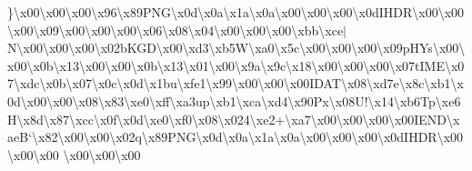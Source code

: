 \begin{DoxyCompactItemize}
\}\textbackslash{}x00\textbackslash{}x00\textbackslash{}x00\textbackslash{}x96\textbackslash{}x89\+P\+N\+G\textbackslash{}x0d\textbackslash{}x0a\textbackslash{}x1a\textbackslash{}x0a\textbackslash{}x00\textbackslash{}x00\textbackslash{}x00\textbackslash{}x0d\+I\+H\+D\+R\textbackslash{}x00\textbackslash{}x00\textbackslash{}x00\textbackslash{}x09\textbackslash{}x00\textbackslash{}x00\textbackslash{}x00\textbackslash{}x06\textbackslash{}x08\textbackslash{}x04\textbackslash{}x00\textbackslash{}x00\textbackslash{}x00\textbackslash{}xbb\textbackslash{}xce$\vert$\+N\textbackslash{}x00\textbackslash{}x00\textbackslash{}x00\textbackslash{}x02b\+K\+G\+D\textbackslash{}x00\textbackslash{}xd3\textbackslash{}xb5\+W\textbackslash{}xa0\textbackslash{}x5c\textbackslash{}x00\textbackslash{}x00\textbackslash{}x00\textbackslash{}x09p\+H\+Ys\textbackslash{}x00\textbackslash{}x00\textbackslash{}x0b\textbackslash{}x13\textbackslash{}x00\textbackslash{}x00\textbackslash{}x0b\textbackslash{}x13\textbackslash{}x01\textbackslash{}x00\textbackslash{}x9a\textbackslash{}x9c\textbackslash{}x18\textbackslash{}x00\textbackslash{}x00\textbackslash{}x00\textbackslash{}x07t\+I\+M\+E\textbackslash{}x07\textbackslash{}xdc\textbackslash{}x0b\textbackslash{}x07\textbackslash{}x0c\textbackslash{}x0d\textbackslash{}x1bu\textbackslash{}xfe1\textbackslash{}x99\textbackslash{}x00\textbackslash{}x00\textbackslash{}x00\textquotesingle{}\+I\+D\+A\+T\textbackslash{}x08\textbackslash{}xd7e\textbackslash{}x8c\textbackslash{}xb1\textbackslash{}x0d\textbackslash{}x00\textbackslash{}x00\textbackslash{}x08\textbackslash{}x83\textbackslash{}xe0\textbackslash{}xff\textbackslash{}xa3up\textbackslash{}xb1\textbackslash{}xca\textbackslash{}xd4\textbackslash{}x90\+Px\textbackslash{}x08\+U!\textbackslash{}x14\textbackslash{}xb6\+Tp\textbackslash{}xe6\+H\textbackslash{}x8d\textbackslash{}x87\textbackslash{}xcc\textbackslash{}x0f\textbackslash{}x0d\textbackslash{}xe0\textbackslash{}xf0\textbackslash{}x08\textbackslash{}x024\textbackslash{}xe2+\textbackslash{}xa7\textbackslash{}x00\textbackslash{}x00\textbackslash{}x00\textbackslash{}x00\+I\+E\+N\+D\textbackslash{}xae\+B`\textbackslash{}x82\textbackslash{}x00\textbackslash{}x00\textbackslash{}x02q\textbackslash{}x89\+P\+N\+G\textbackslash{}x0d\textbackslash{}x0a\textbackslash{}x1a\textbackslash{}x0a\textbackslash{}x00\textbackslash{}x00\textbackslash{}x00\textbackslash{}x0d\+I\+H\+D\+R\textbackslash{}x00\textbackslash{}x00\textbackslash{}x00 \textbackslash{}x00\textbackslash{}x00\textbackslash{}x00 
\end{DoxyCompactItemize}
